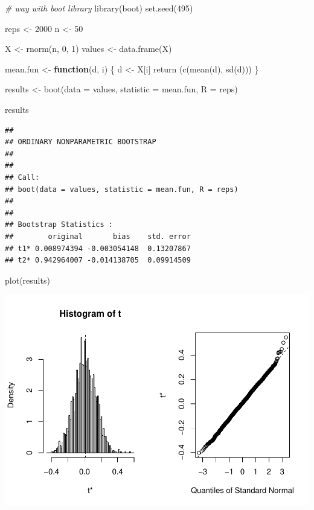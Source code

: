 \documentclass[12pt]{article}
\newenvironment{Shaded}{\begin{snugshade}}{\end{snugshade}}
\newcommand{\AttributeTok}[1]{\textcolor[rgb]{0.77,0.63,0.00}{#1}}
\newcommand{\CommentTok}[1]{\textcolor[rgb]{0.56,0.35,0.01}{\textit{#1}}}
\newcommand{\ControlFlowTok}[1]{\textcolor[rgb]{0.13,0.29,0.53}{\textbf{#1}}}
\newcommand{\DecValTok}[1]{\textcolor[rgb]{0.00,0.00,0.81}{#1}}
\newcommand{\FunctionTok}[1]{\textcolor[rgb]{0.00,0.00,0.00}{#1}}
\newcommand{\NormalTok}[1]{#1}
\newcommand{\OtherTok}[1]{\textcolor[rgb]{0.56,0.35,0.01}{#1}}
\begin{document}
\begin{Shaded}
\begin{Highlighting}[]
\CommentTok{\# way with boot library}
\FunctionTok{library}\NormalTok{(boot)}
\FunctionTok{set.seed}\NormalTok{(}\DecValTok{495}\NormalTok{)}

\NormalTok{reps }\OtherTok{\textless{}{-}} \DecValTok{2000}
\NormalTok{n }\OtherTok{\textless{}{-}} \DecValTok{50}

\NormalTok{X }\OtherTok{\textless{}{-}} \FunctionTok{rnorm}\NormalTok{(n, }\DecValTok{0}\NormalTok{, }\DecValTok{1}\NormalTok{)}
\NormalTok{values }\OtherTok{\textless{}{-}} \FunctionTok{data.frame}\NormalTok{(X)}

\NormalTok{mean.fun }\OtherTok{\textless{}{-}} \ControlFlowTok{function}\NormalTok{(d, i) \{}
\NormalTok{  d }\OtherTok{\textless{}{-}}\NormalTok{ X[i]}
  \FunctionTok{return}\NormalTok{ (}\FunctionTok{c}\NormalTok{(}\FunctionTok{mean}\NormalTok{(d), }\FunctionTok{sd}\NormalTok{(d)))}
\NormalTok{\}}

\NormalTok{results }\OtherTok{\textless{}{-}} \FunctionTok{boot}\NormalTok{(}\AttributeTok{data =}\NormalTok{ values, }\AttributeTok{statistic =}\NormalTok{ mean.fun, }\AttributeTok{R =}\NormalTok{ reps)}

\NormalTok{results}
\end{Highlighting}
\end{Shaded}

\begin{verbatim}
## 
## ORDINARY NONPARAMETRIC BOOTSTRAP
## 
## 
## Call:
## boot(data = values, statistic = mean.fun, R = reps)
## 
## 
## Bootstrap Statistics :
##        original       bias    std. error
## t1* 0.008974394 -0.003054148  0.13207867
## t2* 0.942964007 -0.014138705  0.09914509
\end{verbatim}

\begin{Shaded}
\begin{Highlighting}[]
\FunctionTok{plot}\NormalTok{(results)}
\end{Highlighting}
\end{Shaded}

\includegraphics{paper_files/figure-latex/unnamed-chunk-22-1.pdf}
\end{document}
